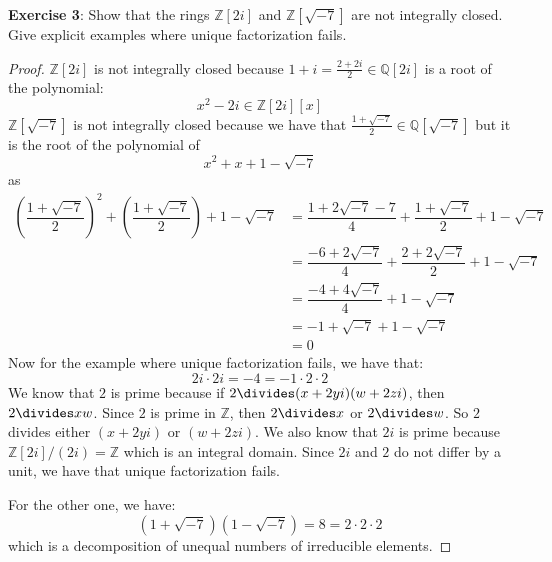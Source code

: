 \documentclass{article}
\begin{document}
\textbf{Exercise 3}: Show that the rings $\mathbb{Z}[2i]$ and $\mathbb{Z}[\sqrt{-7}]$ are not integrally closed. Give explicit examples where unique factorization fails.
    \begin{proof}
        $\mathbb{Z}[2i]$ is not integrally closed because $1 + i = \frac{2 + 2i}{2} \in \mathbb{Q}[2i]$ is a root of the polynomial:
            \begin{equation*}
                x^{2} - 2i \in \mathbb{Z}[2i][x]
            \end{equation*}
        $\mathbb{Z}[\sqrt{-7}]$ is not integrally closed because we have that $\frac{1 + \sqrt{-7}}{2} \in \mathbb{Q}[\sqrt{-7}]$ but it is the root of the polynomial of 
            \begin{equation*}
                x^{2} + x + 1 - \sqrt{-7}
            \end{equation*}
        as
            \begin{align*}
                \left(\dfrac{1 + \sqrt{-7}}{2}\right)^{2} + \left(\dfrac{1 + \sqrt{-7}}{2}\right) + 1 - \sqrt{-7} &= \dfrac{1 + 2\sqrt{-7} -7}{4} + \dfrac{1 + \sqrt{-7}}{2} + 1 - \sqrt{-7} \\
                                                                                                                  &= \dfrac{-6 + 2\sqrt{-7}}{4} + \dfrac{2 + 2\sqrt{-7}}{2} + 1 - \sqrt{-7}  \\
                                                                                                                  &= \dfrac{-4 + 4\sqrt{-7}}{4} + 1 - \sqrt{-7}                              \\
                                                                                                                  &= -1 + \sqrt{-7} + 1 - \sqrt{-7}                                          \\
                                                                                                                  &= 0                                                                         
            \end{align*}
        Now for the example where unique factorization fails, we have that:
            \begin{equation*}
                2i \cdot2i = -4 = -1 \cdot2 \cdot2
            \end{equation*}
        We know that $2$ is prime because if $2 \divides(x + 2yi)(w + 2zi)$, then $2 \divides xw$. Since $2$ is prime in $\mathbb{Z}$, then $2 \divides x$ or $2 \divides w$. So $2$ divides either $(x + 2yi)$ or $(w + 2zi)$. We also know that $2i$ is prime because $\mathbb{Z}[2i]/(2i) = \mathbb{Z}$ which is an integral domain. Since $2i$ and $2$ do not differ by a unit, we have that unique factorization fails.

        For the other one, we have:
            \begin{equation*}
                (1 + \sqrt{-7})(1 - \sqrt{-7}) = 8 = 2 \cdot2 \cdot2
            \end{equation*}
        which is a decomposition of unequal numbers of irreducible elements.
    \end{proof}
\end{document}
